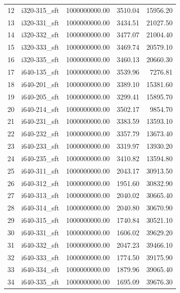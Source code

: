 \begin{tabular}{llrrr}
12 &  i320-315\_sft & 1000000000.00 &           3510.04 &    15956.20 \\
13 &  i320-331\_sft & 1000000000.00 &           3434.51 &    21027.50 \\
14 &  i320-332\_sft & 1000000000.00 &           3477.07 &    21004.40 \\
15 &  i320-333\_sft & 1000000000.00 &           3469.74 &    20579.10 \\
16 &  i320-335\_sft & 1000000000.00 &           3460.13 &    20660.30 \\
17 &  i640-135\_sft & 1000000000.00 &           3539.96 &     7276.81 \\
18 &  i640-201\_sft & 1000000000.00 &           3389.10 &    15381.60 \\
19 &  i640-205\_sft & 1000000000.00 &           3299.41 &    15895.70 \\
20 &  i640-214\_sft & 1000000000.00 &           3502.17 &     9854.70 \\
21 &  i640-231\_sft & 1000000000.00 &           3383.59 &    13593.10 \\
22 &  i640-232\_sft & 1000000000.00 &           3357.79 &    13673.40 \\
23 &  i640-233\_sft & 1000000000.00 &           3319.97 &    13930.20 \\
24 &  i640-235\_sft & 1000000000.00 &           3410.82 &    13594.80 \\
25 &  i640-311\_sft & 1000000000.00 &           2043.17 &    30913.50 \\
26 &  i640-312\_sft & 1000000000.00 &           1951.60 &    30832.90 \\
27 &  i640-313\_sft & 1000000000.00 &           2040.02 &    30665.40 \\
28 &  i640-314\_sft & 1000000000.00 &           2040.80 &    30670.90 \\
29 &  i640-315\_sft & 1000000000.00 &           1740.84 &    30521.10 \\
30 &  i640-331\_sft & 1000000000.00 &           1606.02 &    39629.20 \\
31 &  i640-332\_sft & 1000000000.00 &           2047.23 &    39466.10 \\
32 &  i640-333\_sft & 1000000000.00 &           1774.50 &    39175.90 \\
33 &  i640-334\_sft & 1000000000.00 &           1879.96 &    39065.40 \\
34 &  i640-335\_sft & 1000000000.00 &           1695.09 &    39676.30 \\
\bottomrule
\end{tabular}
